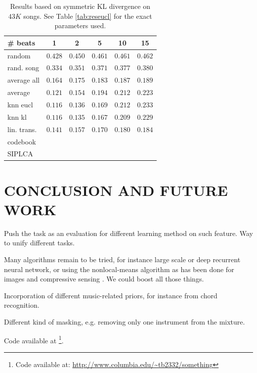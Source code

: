 \documentclass{article}
\begin{document}
\begin{table}[t]
\begin{small}
\begin{center}
\begin{tabular}{l|c|c|c|c|c|}
\# beats & 1 & 2 & 5 & 10 & 15 \\ \hline \hline
random & $0.428$ & $0.450$ & $0.461$ & $0.461$ & $0.462$  \\
rand. song & $0.334$ & $0.351$ & $0.371$ & $0.377$ & $0.380$  \\
average all & $0.164$ & $0.175$ & $0.183$ & $0.187$ & $0.189$ \\ 
average & $0.121$ & $0.154$ & $0.194$ & $0.212$ &  $0.223$ \\ \hline
knn eucl & $\mathbf{0.116}$ & $0.136$ & $0.169$ & $0.212$ & $0.233$ \\
knn kl & $\mathbf{0.116}$ & $\mathbf{0.135}$ & $\mathbf{0.167}$ & $0.209$ & $0.229$ \\
lin. trans. & $0.141$ & $0.157$ & $0.170$ & $\mathbf{0.180}$ & $\mathbf{0.184}$ \\
codebook & & & & &  \\
SIPLCA & & & & &  \\ \hline
\end{tabular}
\caption{Results based on symmetric KL divergence on $43K$ songs.
See Table \ref{tab:reseucl} for the exact parameters used.}
\label{tab:reskl}
\end{center}
\end{small}
\end{table}

\section{CONCLUSION AND FUTURE WORK}
\label{sec:conclusion}
Push the task as an evaluation for different learning method on such feature.
Way to unify different tasks.

Many algorithms remain to be tried, for instance large scale or deep recurrent
neural network, or using the nonlocal-means algorithm as has been done for
images \cite{Buades2005} and compressive sensing \cite{Gemmeke2008}.
We could boost all those things.

Incorporation of different music-related priors, for instance from chord recognition.

Different kind of masking, e.g. removing only one instrument from the mixture.

Code available at \footnote{Code available at: \url{http://www.columbia.edu/~tb2332/something}}.





\end{document}
